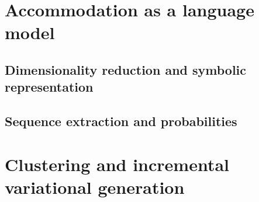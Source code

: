 \section{Accommodation as a language model}
\label{sec:accommodation_as_a_lm}

\subsection{Dimensionality reduction and symbolic representation}
\label{subsec:dim_reduction_and_symbolic_rep}

\subsection{Sequence extraction and probabilities}
\label{subsec:word_extraction_and_seq_prob}

\section{Clustering and incremental variational generation}
\label{clustering_and_incremental_generation}

